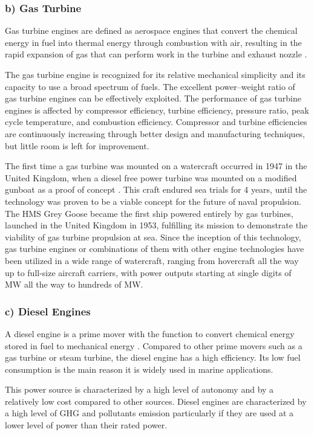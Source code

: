 \subsubsection{b) Gas Turbine}
Gas turbine engines are defined as aerospace engines that convert the chemical energy in fuel into thermal energy through combustion with air, resulting in the rapid expansion of gas that can perform work in the turbine and exhaust nozzle \cite{SD}. 

The gas turbine engine is recognized for its relative mechanical simplicity and its capacity to use a broad spectrum of fuels. The excellent power–weight ratio of gas turbine engines can be effectively exploited. The performance of gas turbine engines is affected by compressor efficiency, turbine efficiency, pressure ratio, peak cycle temperature, and combustion efficiency. Compressor and turbine efficiencies are continuously increasing through better design and manufacturing techniques, but little room is left for improvement.

The first time a gas turbine was mounted on a watercraft occurred in 1947 in the United Kingdom, when a diesel free power turbine was mounted on a modified gunboat as a proof of concept \cite{Stepan}. This craft endured sea trials for 4 years, until the technology was proven to be a viable concept for the future of naval propulsion. The HMS Grey Goose became the first ship powered entirely by gas turbines, launched in the United Kingdom in 1953, fulfilling its mission to demonstrate the viability of gas turbine propulsion at sea. Since the inception of this technology, gas turbine engines or combinations of them with other engine technologies have been utilized in a wide range of watercraft, ranging from hovercraft all the way up to full-size aircraft carriers, with power outputs starting at single digits of MW all the way to hundreds of MW.

\subsubsection{c) Diesel Engines}
A diesel engine is a prime mover with the function to convert chemical energy stored in fuel to mechanical energy \cite{Bennabi} \cite{Bas}. Compared to other prime movers such as a gas turbine or steam turbine, the diesel engine has a high efficiency. Its low fuel consumption is the main reason it is widely used in marine applications.

This power source is characterized by a high level of autonomy and by a relatively low cost compared to other sources. Diesel engines are characterized by a high level of GHG and pollutants emission particularly if they are used at a lower level of power than their rated power. 

